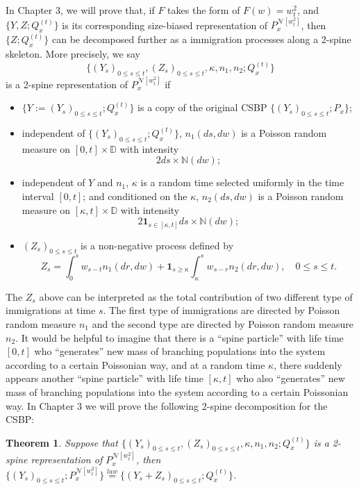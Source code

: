 \documentclass[UTF8]{pkuthss}
\theoremstyle{plain}
\newtheorem{thm}{Theorem}[section]
\theoremstyle{definition}
\numberwithin{equation}{section}
\begin{document}
	In Chapter 3, we will prove that, if $F$ takes the form of $F(w) = w_t^2$, and $\{Y,Z; Q_x^{(t)}\}$ is its corresponding size-biased representation of $P_x^{\mathcal N[w_t^2]}$, then $\{Z; Q_x^{(t)}\}$ can be decomposed further as a immigration processes along a 2-spine skeleton. More precisely, we say \[\{(Y_s)_{0\leq s\leq t}, (Z_s)_{0\leq s\leq t}, \kappa, n_1, n_2; Q_x^{(t)}\}\] is a 2-spine representation of $P_x^{\mathcal N[w_t^2]}$ if
\begin{itemize}
\item
	$\{Y:=(Y_s)_{0\leq s\leq t}; Q_x^{(t)}\}$ is a copy of the original CSBP $\{(Y_s)_{0\leq s\leq t}; P_x\}$;
\item
	independent of $\{(Y_s)_{0\leq s\leq t}; Q_x^{(t)}\}$, $n_1(ds,dw)$ is a Poisson random measure on $[0,t]\times \mathbb D$ with intensity
\[
	2ds\times \mathbb N(dw);
\]
\item
	independent of $Y$ and $n_1$, $\kappa$ is a random time selected uniformly in the time interval $[0,t]$; and conditioned on the $\kappa$, $n_2(ds,dw)$ is a Poisson random measure on $[\kappa, t]\times \mathbb D$ with intensity
\[
	2\mathbf 1_{s\in [\kappa, t]}ds \times \mathbb N(dw);
\]
\item
	$(Z_s)_{0\leq s\leq t}$ is a non-negative process defined by
\[
	Z_s = \int_0^s w_{s-t} n_1(dr,dw) + \mathbf 1_{s\geq \kappa}\int_{\kappa}^s w_{s-r}n_2(dr,dw),\quad 0\leq s\leq t.
\]
\end{itemize}
	The $Z_s$ above can be interpreted as the total contribution of two different type of immigrations at time $s$. The first type of immigrations are directed by Poisson random measure $n_1$ and the second type are directed by Poisson random measure $n_2$. It would be helpful to imagine that there is a ``spine particle'' with life time $[0,t]$ who ``generates'' new mass of branching populations into the system according to a certain Poissonian way, and at a random time $\kappa$, there suddenly appears another ``spine particle'' with life time $[\kappa, t]$ who also ``generates'' new mass of branching populations into the system according to a certain Poissonian way. 
	In Chapter 3 we will prove the following 2-spine decomposition for the CSBP:
\begin{thm}
\label{thm: 2-spine decomposition for CSBP}
	Suppose that $\{(Y_s)_{0\leq s\leq t}, (Z_s)_{0\leq s\leq t}, \kappa, n_1, n_2; Q_x^{(t)}\}$ is a 2-spine representation of $P_x^{\mathcal N[w_t^2]}$, then $\{(Y_s)_{0\leq s\leq t}; P_x^{\mathcal N[w_t^2]}\}\overset{law}{=}\{(Y_s + Z_s)_{0\leq s\leq t}; Q_x^{(t)}\}$.
\end{thm}
	
\end{document}
